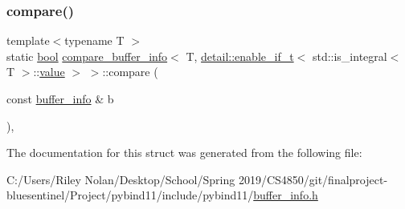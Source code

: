\subsubsection{\texorpdfstring{compare()}{compare()}}
{\footnotesize\ttfamily template$<$typename T $>$ \\
static \mbox{\hyperlink{asdl_8h_af6a258d8f3ee5206d682d799316314b1}{bool}} \mbox{\hyperlink{structcompare__buffer__info}{compare\+\_\+buffer\+\_\+info}}$<$ T, \mbox{\hyperlink{detail_2common_8h_a012819c9e8b5e04872a271f50f8b8196}{detail\+::enable\+\_\+if\+\_\+t}}$<$ std\+::is\+\_\+integral$<$ T $>$\+::\mbox{\hyperlink{_s_d_l__opengl__glext_8h_a8ad81492d410ff2ac11f754f4042150f}{value}} $>$ $>$\+::compare (\begin{DoxyParamCaption}\item[{const \mbox{\hyperlink{structbuffer__info}{buffer\+\_\+info}} \&}]{b }\end{DoxyParamCaption})\hspace{0.3cm}{\ttfamily [inline]}, {\ttfamily [static]}}



The documentation for this struct was generated from the following file\+:\begin{DoxyCompactItemize}
\item 
C\+:/\+Users/\+Riley Nolan/\+Desktop/\+School/\+Spring 2019/\+C\+S4850/git/finalproject-\/bluesentinel/\+Project/pybind11/include/pybind11/\mbox{\hyperlink{buffer__info_8h}{buffer\+\_\+info.\+h}}\end{DoxyCompactItemize}
